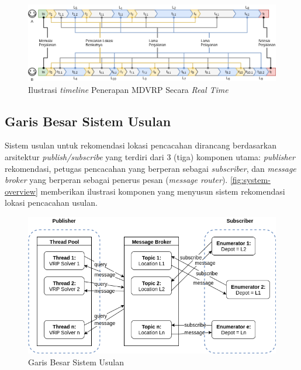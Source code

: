 \begin{figure}[!]
	\centering
	\includegraphics[width=\textwidth]{Resources/Images/illustration-timeline-realtime-mdvrp}
	\caption{Ilustrasi \textit{timeline} Penerapan MDVRP Secara \textit{Real Time}}
	\label{fig:illustration-timeline-realtime-mdvrp}
\end{figure}

\subsection{Garis Besar Sistem Usulan}
Sistem usulan untuk rekomendasi lokasi pencacahan dirancang berdasarkan arsitektur \textit{publish/subscribe} yang terdiri dari 3 (tiga) komponen utama: \textit{publisher} rekomendasi, petugas pencacahan yang berperan sebagai \textit{subscriber}, dan \textit{message broker} yang berperan sebagai penerus pesan (\textit{message router}). \autoref{fig:system-overview} memberikan ilustrasi komponen yang menyusun sistem rekomendasi lokasi pencacahan usulan.


\begin{figure}[!]
	\centering
	\includegraphics[width=\textwidth]{Resources/Images/system-overview}
	\caption{Garis Besar Sistem Usulan}
	\label{fig:system-overview}
\end{figure}


